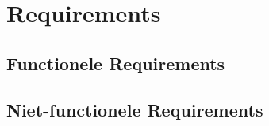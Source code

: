 \section{Requirements}

\subsection{Functionele Requirements}

\subsection{Niet-functionele Requirements}

